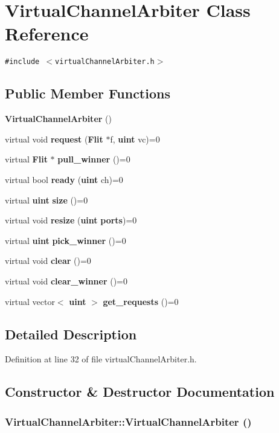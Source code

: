 \section{VirtualChannelArbiter Class Reference}
\label{classVirtualChannelArbiter}
{\tt \#include $<$virtualChannelArbiter.h$>$}

\subsection*{Public Member Functions}
\begin{CompactItemize}
\item 
{\bf VirtualChannelArbiter} ()
\item 
virtual void {\bf request} ({\bf Flit} $\ast$f, {\bf uint} vc)=0
\item 
virtual {\bf Flit} $\ast$ {\bf pull\_\-winner} ()=0
\item 
virtual bool {\bf ready} ({\bf uint} ch)=0
\item 
virtual {\bf uint} {\bf size} ()=0
\item 
virtual void {\bf resize} ({\bf uint} {\bf ports})=0
\item 
virtual {\bf uint} {\bf pick\_\-winner} ()=0
\item 
virtual void {\bf clear} ()=0
\item 
virtual void {\bf clear\_\-winner} ()=0
\item 
virtual vector$<$ {\bf uint} $>$ {\bf get\_\-requests} ()=0
\end{CompactItemize}


\subsection{Detailed Description}


Definition at line 32 of file virtualChannelArbiter.h.

\subsection{Constructor \& Destructor Documentation}
\subsubsection[{VirtualChannelArbiter}]{\setlength{\rightskip}{0pt plus 5cm}VirtualChannelArbiter::VirtualChannelArbiter ()\hspace{0.3cm}{\tt  [inline]}}\label{classVirtualChannelArbiter_ceadea036b8d216d8b5a52b40d11daf3}




